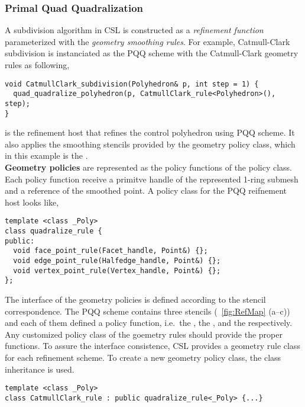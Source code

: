 


\subsubsection{Primal Quad Quadralization}
A subdivision algorithm in CSL is constructed as a
\emph{refinement function} parameterized with the 
\emph{geometry smoothing rules}. For example, Catmull-Clark
subdivision is instanciated as the PQQ scheme with
the Catmull-Clark geometry rules as following,
\begin{lstlisting}
void CatmullClark_subdivision(Polyhedron& p, int step = 1) {
  quad_quadralize_polyhedron(p, CatmullClark_rule<Polyhedron>(), step);
}
\end{lstlisting}

 is the refinement host
that refines the control polyhedron using PQQ scheme. It also
applies the smoothing stencils provided by the geometry policy 
class, which in this example is the .
\\
\noindent \textbf{Geometry policies} are represented as
the policy functions of the policy class. Each policy function
receive a primitve handle of the represented 1-ring submesh and
a reference of the smoothed point. A policy class for the PQQ
reifnement host looks like,
\begin{lstlisting}
template <class _Poly>
class quadralize_rule {
public:
  void face_point_rule(Facet_handle, Point&) {};
  void edge_point_rule(Halfedge_handle, Point&) {};
  void vertex_point_rule(Vertex_handle, Point&) {};
};
\end{lstlisting}
The interface of the geometry policies is defined according to
the stencil correspondence. The PQQ scheme contains three 
stencils (\figurename\ \ref{fig:RefMap} (a--c)) and each of them
defined a policy function, i.e.\ the , the 
, and the  
respectively. Any customized policy class of the goemetry 
rules should provide the proper functions.
To assure the interface consistence, CSL provides
a geometry rule class for each refinement scheme. To create a new
geometry policy class, the class inheritance is used.
\begin{lstlisting}
template <class _Poly>
class CatmullClark_rule : public quadralize_rule<_Poly> {...}
\end{lstlisting}

